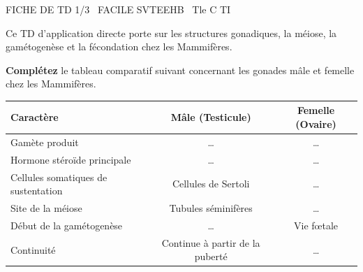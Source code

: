 \documentclass[11pt]{article}
\begin{document}
\begin{tcolorbox}[enhanced,colback=popink,colframe=popink,arc=10pt,boxrule=0pt,left=12pt,right=12pt,top=9pt,bottom=9pt]
{\color{white}\popxbold\small FICHE DE TD 1/3 \textbullet\ FACILE \hfill SVTEEHB \textbullet\ Tle C TI\par}
\end{tcolorbox}
\vspace{4pt}
Ce TD d'application directe porte sur les structures gonadiques, la méiose, la gamétogenèse et la fécondation chez les Mammifères.

\begin{exercice}
\textbf{Complétez} le tableau comparatif suivant concernant les gonades mâle et femelle chez les Mammifères.
\begin{tabularx}{\linewidth}{|X|c|c|}
\hline
\textbf{Caractère} & \textbf{Mâle (Testicule)} & \textbf{Femelle (Ovaire)} \\
\hline
Gamète produit & \ldots & \ldots \\
\hline
Hormone stéroïde principale & \ldots & \ldots \\
\hline
Cellules somatiques de sustentation & Cellules de Sertoli & \ldots \\
\hline
Site de la méiose & Tubules séminifères & \ldots \\
\hline
Début de la gamétogenèse & \ldots & Vie fœtale \\
\hline
Continuité & Continue à partir de la puberté & \ldots \\
\hline
\end{tabularx}
\end{exercice}
\end{document}
